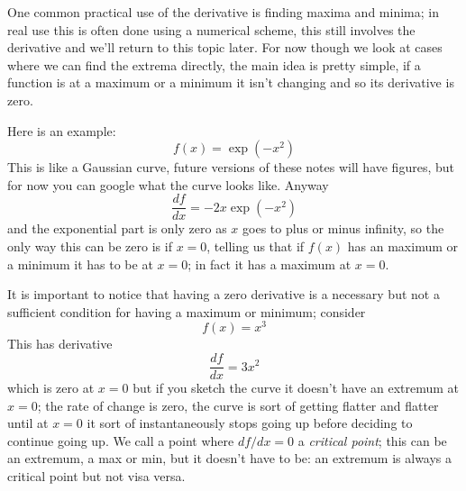 \documentclass[12pt]{article}
\begin{document}
One common practical use of the derivative is finding maxima and
minima; in real use this is often done using a numerical scheme, this
still involves the derivative and we'll return to this topic
later. For now though we look at cases where we can find the extrema
directly, the main idea is pretty simple, if a function is at a
maximum or a minimum it isn't changing and so its derivative is zero.

Here is an example:
\begin{equation}
  f(x)=\exp{(-x^2)}
\end{equation}
This is like a Gaussian curve, future versions of these notes will
have figures, but for now you can google what the curve looks
like. Anyway
\begin{equation}
  \frac{df}{dx}=-2x\exp{(-x^2)}
\end{equation}
and the exponential part is only zero as $x$ goes to plus or minus
infinity, so the only way this can be zero is if $x=0$, telling us
that if $f(x)$ has an maximum or a minimum it has to be at $x=0$; in
fact it has a maximum at $x=0$.

It is important to notice that having a zero derivative is a necessary
but not a sufficient condition for having a maximum or minimum; consider
\begin{equation}
  f(x)=x^3
\end{equation}
This has derivative
\begin{equation}
  \frac{df}{dx}=3x^2
\end{equation}
which is zero at $x=0$ but if you sketch the curve it doesn't have an
extremum at $x=0$; the rate of change is zero, the curve is sort of
getting flatter and flatter until at $x=0$ it sort of instantaneously
stops going up before deciding to continue going up. We call a point where $df/dx=0$ a \textsl{critical point}; this can be an extremum, a max or min, but it doesn't have to be: an extremum is always a critical point but not visa versa.
\end{document}
